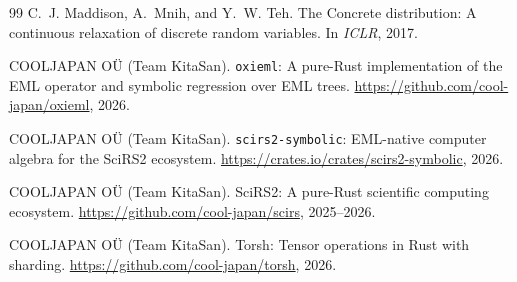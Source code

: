 \documentclass{article}
\begin{document}
\begin{thebibliography}{99}
C.~J. Maddison, A.~Mnih, and Y.~W. Teh.
\newblock The Concrete distribution: A continuous relaxation of discrete
  random variables.
\newblock In \emph{ICLR}, 2017.

COOLJAPAN O\"U (Team KitaSan).
\newblock \texttt{oxieml}: A pure-Rust implementation of the EML operator
  and symbolic regression over EML trees.
\newblock \url{https://github.com/cool-japan/oxieml}, 2026.

COOLJAPAN O\"U (Team KitaSan).
\newblock \texttt{scirs2-symbolic}: EML-native computer algebra for the
  SciRS2 ecosystem.
\newblock \url{https://crates.io/crates/scirs2-symbolic}, 2026.

COOLJAPAN O\"U (Team KitaSan).
\newblock SciRS2: A pure-Rust scientific computing ecosystem.
\newblock \url{https://github.com/cool-japan/scirs}, 2025--2026.

COOLJAPAN O\"U (Team KitaSan).
\newblock Torsh: Tensor operations in Rust with sharding.
\newblock \url{https://github.com/cool-japan/torsh}, 2026.

\end{thebibliography}
\end{document}
